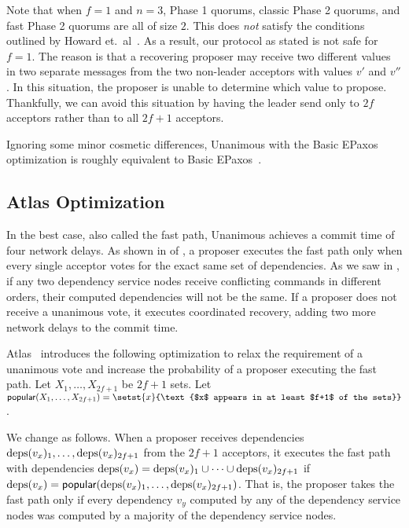 Note that when $f = 1$ and $n = 3$, Phase 1 quorums, classic Phase 2 quorums,
and fast Phase 2 quorums are all of size $2$. This does \emph{not} satisfy the
conditions outlined by Howard et.\ al~\cite{howard2021fast}. As a result, our
protocol as stated is not safe for $f=1$. The reason is that a recovering
proposer may receive two different values in two separate 
messages from the two non-leader acceptors with values $v'$ and $v''$. In this
situation, the proposer is unable to determine which value to propose.
Thankfully, we can avoid this situation by having the leader send only to $2f$
acceptors rather than to all $2f+1$ acceptors.

Ignoring some minor cosmetic differences, Unanimous \BPaxos{} with the Basic
EPaxos optimization is roughly equivalent to Basic
EPaxos~\cite{moraru2013there}.

\subsection{Atlas Optimization}
In the best case, also called the fast path, Unanimous \BPaxos{} achieves a
commit time of four network delays. As shown in  of
, a proposer executes the fast path only when
every single acceptor votes for the exact same set of dependencies. As we saw
in , if any two dependency service nodes receive
conflicting commands in different orders, their computed dependencies will not
be the same. If a proposer does not receive a unanimous vote, it executes
coordinated recovery, adding two more network delays to the commit time.

\newcommand{\popular}[1]{\textsf{popular}(#1)}
Atlas~\cite{enes2020state} introduces the following optimization to relax the
requirement of a unanimous vote and increase the probability of a proposer
executing the fast path. Let $X_1, \ldots, X_{2f+1}$ be $2f+1$ sets. Let
$\popular{X_1, \ldots, X_{2f+1}} = \setst{x}{\text{$x$ appears in at least
$f+1$ of the sets}}$.

We change  as follows. When a proposer receives
dependencies $\text{deps}(v_x)_1, \ldots, \text{deps}(v_x)_{2f+1}$ from the $2f+1$
acceptors, it executes the fast path with dependencies $\text{deps}(v_x) =
\text{deps}(v_x)_1 \cup \cdots \cup \text{deps}(v_x)_{2f+1}$ if $\deps{v_x} =
\popular{\deps{v_x}_1, \ldots, \deps{v_x}_{2f+1}}$. That is, the proposer takes
the fast path only if every dependency $v_y$ computed by any of the dependency
service nodes was computed by a majority of the dependency service nodes.

